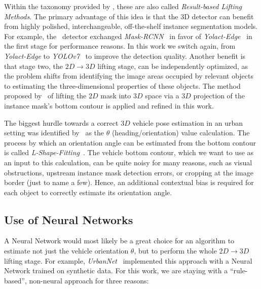 Within the taxonomy provided by \cite{survey2022}, these are also called \textit{Result-based Lifting Methods}. The primary advantage of this idea is that the 3D detector can benefit from highly polished, interchangeable, off-the-shelf instance segmentation models.
For example, the~\cite{leonthesis} detector exchanged \textit{Mask-RCNN}~\cite{he2017mask} in favor of \textit{Yolact-Edge}~\cite{liu2021yolactedge} in the first stage for performance reasons.
In this work we switch again, from \textit{Yolact-Edge} to \textit{YOLOv7}~\cite{wang2022yolov7} to improve the detection quality.
Another benefit is that stage two, the $2D \rightarrow 3D$ lifting stage, can be independently optimized, as the problem shifts from identifying the image areas occupied by relevant objects to estimating the three-dimensional properties of these objects.
The method proposed by~\cite{leonthesis} of lifting the $2D$ mask into $3D$ space via a $3D$ projection of the instance mask's bottom contour is applied and refined in this work.

The biggest hurdle towards a correct $3D$ vehicle pose estimation in an urban setting was identified by~\cite{leonthesis} as the $\theta$ (heading/orientation) value calculation.
The process by which an orientation angle can be estimated from the bottom contour is called \textit{L-Shape-Fitting}~\cite{zhang2017efficient}.
The vehicle bottom contour, which we want to use as an input to this calculation, can be quite noisy for many reasons, such as visual obstructions, upstream instance mask detection errors, or cropping at the image border (just to name a few).
Hence, an additional contextual bias is required for each object to correctly estimate its orientation angle.

\subsection{Use of Neural Networks}
\label{subsec:neural}

A Neural Network would most likely be a great choice for an algorithm to estimate not just the vehicle orientation $\theta$, but to perform the whole $2D \rightarrow 3D$ lifting stage.
For example, \textit{UrbanNet}~\cite{carrillo2021urbannet} implemented this approach with a Neural Network trained on synthetic data.
For this work, we are staying with a \enquote{rule-based}, non-neural approach for three reasons:

